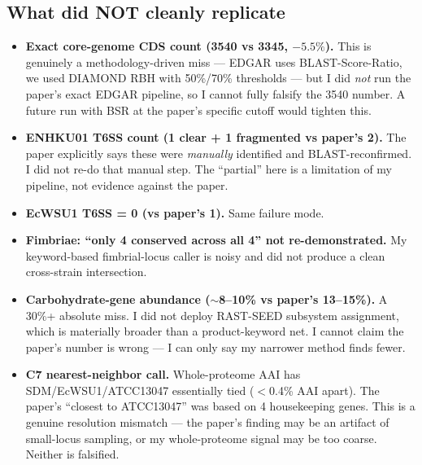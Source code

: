 \documentclass[11pt,letterpaper]{article}
\begin{document}
\subsection*{What did NOT cleanly replicate}
\begin{itemize}[leftmargin=*]
    \item \textbf{Exact core-genome CDS count (3540 vs 3345, $-5.5\%$).} This is genuinely a methodology-driven miss --- EDGAR uses BLAST-Score-Ratio, we used DIAMOND RBH with 50\%/70\% thresholds --- but I did \emph{not} run the paper's exact EDGAR pipeline, so I cannot fully falsify the 3540 number. A future run with BSR at the paper's specific cutoff would tighten this.
    \item \textbf{ENHKU01 T6SS count (1 clear + 1 fragmented vs paper's 2).} The paper explicitly says these were \emph{manually} identified and BLAST-reconfirmed. I did not re-do that manual step. The ``partial'' here is a limitation of my pipeline, not evidence against the paper.
    \item \textbf{EcWSU1 T6SS = 0 (vs paper's 1).} Same failure mode.
    \item \textbf{Fimbriae: ``only 4 conserved across all 4'' not re-demonstrated.} My keyword-based fimbrial-locus caller is noisy and did not produce a clean cross-strain intersection.
    \item \textbf{Carbohydrate-gene abundance ($\sim$8--10\% vs paper's 13--15\%).} A 30\%+ absolute miss. I did not deploy RAST-SEED subsystem assignment, which is materially broader than a product-keyword net. I cannot claim the paper's number is wrong --- I can only say my narrower method finds fewer.
    \item \textbf{C7 nearest-neighbor call.} Whole-proteome AAI has SDM/EcWSU1/ATCC13047 essentially tied ($<$0.4\% AAI apart). The paper's ``closest to ATCC13047'' was based on 4 housekeeping genes. This is a genuine resolution mismatch --- the paper's finding may be an artifact of small-locus sampling, or my whole-proteome signal may be too coarse. Neither is falsified.
\end{itemize}
\end{document}
